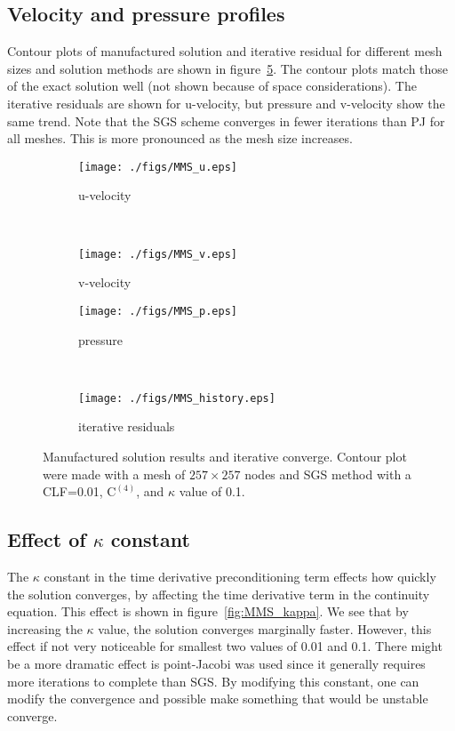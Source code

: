 \documentclass[10pt, letterpaper]{article}
\newcommand{\mesh}[1]{${#1} \times {#1}$}
\begin{document}
\subsection{Velocity and pressure profiles}

Contour plots of manufactured solution and iterative residual for different
mesh sizes and solution methods are shown in figure~\ref{fig:MMS}.  The contour
plots match those of the exact solution well (not shown because of space
considerations).  The iterative residuals are shown for u-velocity, but pressure
and v-velocity show the same trend.  Note that the SGS scheme converges in
fewer iterations than PJ for all meshes.  This is more pronounced as the 
mesh size increases.

\begin{figure}[hb]
	\centering
	\begin{subfigure}[b]{0.475\textwidth}
		\centering
		\texttt{[image: ./figs/MMS\_u.eps]}
		\caption{u-velocity}
		\label{fig:MMS_u}
	\end{subfigure}
	~
	\begin{subfigure}[b]{0.475\textwidth}
		\centering
		\texttt{[image: ./figs/MMS\_v.eps]}
		\caption{v-velocity}
		\label{fig:MMS_v}
	\end{subfigure}
	
	\begin{subfigure}[b]{0.475\textwidth}
		\centering
		\texttt{[image: ./figs/MMS\_p.eps]}
		\caption{pressure}
		\label{fig:MMS_p}
	\end{subfigure}
	~
	\begin{subfigure}[b]{0.475\textwidth}
		\centering
		\texttt{[image: ./figs/MMS\_history.eps]}
		\caption{iterative residuals}
		\label{fig:MMS_history}
	\end{subfigure}
	\caption{Manufactured solution results and iterative converge.  Contour
		plot were made with a mesh of \mesh{257} nodes and SGS method with
		a CLF=0.01, $\mathrm{C^{(4)}}$, and $\kappa$ value of 0.1.}
	\label{fig:MMS}
\end{figure}

\clearpage


\subsection{Effect of $\kappa$ constant}

The $\kappa$ constant in the time derivative preconditioning term effects how 
quickly the solution converges, by affecting the time derivative term in the
continuity equation.  This effect is shown in figure~\ref{fig:MMS_kappa}.  We see
that by increasing the $\kappa$ value, the solution converges marginally faster.
However, this effect if not very noticeable for smallest two values of
0.01 and 0.1.  There might be a more dramatic effect is point-Jacobi was used
since it generally requires more iterations to complete than SGS.  By modifying
this constant, one can modify the convergence and possible make something that
would be unstable converge.
\end{document}
